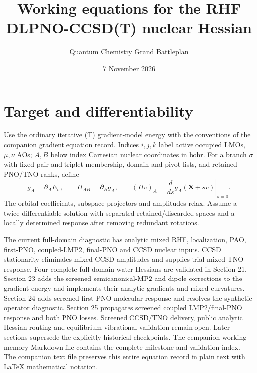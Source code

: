 \documentclass[11pt]{article}
\title{Working equations for the RHF DLPNO-CCSD(T) nuclear Hessian}
\author{Quantum Chemistry Grand Battleplan}
\date{7 November 2026}
\begin{document}
\maketitle

\section{Target and differentiability}
Use the ordinary iterative (T) gradient-model energy with the conventions of
the companion gradient equation record. Indices $i,j,k$ label active occupied
LMOs, $\mu,\nu$ AOs; $A,B$ below index Cartesian nuclear coordinates in bohr.
For a branch $\sigma$ with fixed pair and triplet membership, domain and pivot
lists, and retained PNO/TNO ranks, define
\begin{equation}
 g_A=\partial_A E_\sigma,\qquad H_{AB}=\partial_B g_A,\qquad
 (Hv)_A=\left.\frac{d}{ds}g_A(\mathbf X+s v)\right|_{s=0}.
 \label{eq:target}
\end{equation}
The orbital coefficients, subspace projectors and amplitudes relax. Assume
a twice differentiable solution with separated retained/discarded spaces
and a locally determined response after removing redundant rotations.

The current full-domain diagnostic has analytic mixed RHF, localization, PAO,
first-PNO, coupled-LMP2, final-PNO and CCSD nuclear inputs. CCSD stationarity
eliminates mixed CCSD amplitudes and supplies trial mixed TNO response.
Four complete full-domain water Hessians are validated in Section 21.
Section 23 adds the screened semicanonical-MP2 and dipole corrections to
the gradient energy and implements their analytic gradients and mixed
curvatures. Section 24 adds screened first-PNO molecular response and resolves
the synthetic operator diagnostic. Section 25 propagates screened coupled
LMP2/final-PNO response and both PNO losses. Screened CCSD/TNO delivery, public
analytic Hessian routing and equilibrium vibrational validation remain open.
Later sections supersede the explicitly historical checkpoints.
The companion working-memory Markdown file contains
the complete milestone and validation index. The companion text file preserves
this entire equation record in plain text with LaTeX mathematical notation.
\end{document}
